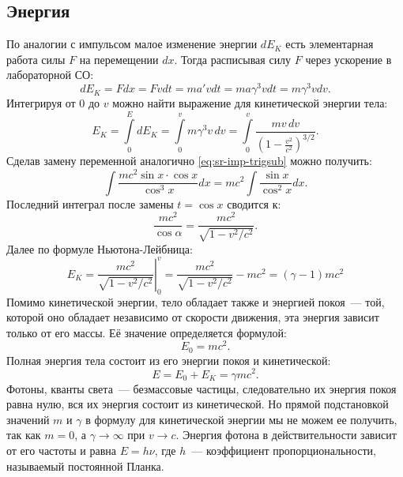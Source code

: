 \subsection{Энергия}
По аналогии с импульсом малое изменение энергии $dE_K$ есть элементарная работа силы $F$ на перемещении $dx$. Тогда расписывая силу $F$ через ускорение в лабораторной СО:
\begin{equation*}
	dE_K = F dx = F v dt = m a' v dt = m a \gamma^{3} v dt = m \gamma^{3} v dv.
\end{equation*}
Интегрируя от 0 до $v$ можно найти выражение для кинетической энергии тела:
\begin{equation*}
	E_K = \int\limits_0^{E} dE_K = \int\limits_0^{v} m \gamma^{3}v \,dv= \int\limits_0^{v} \frac{m v \, dv}{\left(1 - \frac{v^2}{c^2}\right)^{3/2}}.
\end{equation*}
Сделав замену переменной аналогично \eqref{eq:sr-imp-trigsub} можно получить:
\begin{equation*}
	\int \frac{m c^2 \sin x \cdot \cos x}{\cos ^{3} x} d x=m c^2 \int \frac{\sin x}{\cos ^2 x} d x.
\end{equation*}
Последний интеграл после замены $t = \cos x$ сводится к:
\begin{equation*}
	\frac{m c^2}{\cos \alpha}=\frac{m c^2}{\sqrt{1-v^2 / c^2}}.
\end{equation*}
Далее по формуле Ньютона-Лейбница:
\begin{equation}
E_K=\left.\frac{m c^2}{\sqrt{1-v^2 / c^2}}\right|_0 ^v=\frac{m c^2}{\sqrt{1-v^2 / c^2}}-m c^2=(\gamma-1) m c^2
\end{equation}
Помимо кинетической энергии, тело обладает также и энергией покоя~--- той, которой оно обладает независимо от скорости движения, эта энергия зависит только от его массы. Её значение определяется формулой:
\begin{equation}
	E_0 = m c^2.
\end{equation}
Полная энергия тела состоит из его энергии покоя и кинетической:
\begin{equation}
	E=E_0+E_K=\gamma m c^2.
\end{equation}
Фотоны, кванты света~--- безмассовые частицы, следовательно их энергия покоя равна нулю, вся их энергия состоит из кинетической. Но прямой подстановкой значений $m$ и $\gamma$ в формулу для кинетической энергии мы не можем ее получить, так как $m=0$, а $\gamma \rightarrow \infty$ при $v \rightarrow c$. Энергия фотона в действительности зависит от его частоты и равна $E=h \nu$, где $h$~--- коэффициент пропорциональности, называемый постоянной Планка.